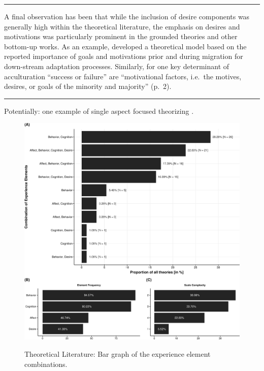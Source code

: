 \begin{center}\rule{0.5\linewidth}{0.5pt}\end{center}

A final observation has been that while the inclusion of desire
components was generally high within the theoretical literature, the
emphasis on desires and motivations was particularly prominent in the
grounded theories and other bottom-up works. As an example,
\citet[][]{Kim2019} developed a theoretical model based on the reported
importance of goals and motivations prior and during migration for
down-stream adaptation processes. Similarly, for
\citet[][]{Mchitarjan2015} one key determinant of acculturation
``success or failure'' are ``motivational factors, i.e.~the motives,
desires, or goals of the minority and majority'' (p.~2).

\begin{center}\rule{0.5\linewidth}{0.5pt}\end{center}

Potentially: one example of single aspect focused theorizing
\citep[e.g.][]{Weinreich2009}.

\color{black}

\begin{figure}[h]
\centering
\caption{Theoretical Literature: Bar graph of the experience element combinations.}
\includegraphics[width=\textwidth]{Figures/TheoriesFreq-1}
\label{fig:ElementsTheories}
\end{figure}

